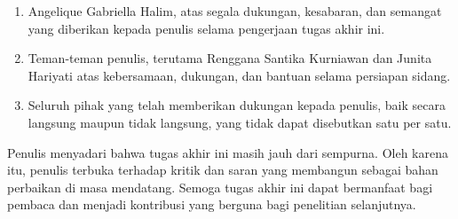 {\begin{enumerate}
	\item Angelique Gabriella Halim, atas segala dukungan, kesabaran, dan semangat yang diberikan kepada penulis selama pengerjaan tugas akhir ini.
		
	\item Teman-teman penulis, terutama Renggana Santika Kurniawan dan Junita Hariyati atas kebersamaan, dukungan, dan bantuan selama persiapan sidang.
		
	\item Seluruh pihak yang telah memberikan dukungan kepada penulis, baik secara langsung maupun tidak langsung, yang tidak dapat disebutkan satu per satu.
\end{enumerate}
	
Penulis menyadari bahwa tugas akhir ini masih jauh dari sempurna. Oleh karena itu, penulis terbuka terhadap kritik dan saran yang membangun sebagai bahan perbaikan di masa mendatang. Semoga tugas akhir ini dapat bermanfaat bagi pembaca dan menjadi kontribusi yang berguna bagi penelitian selanjutnya.} 


